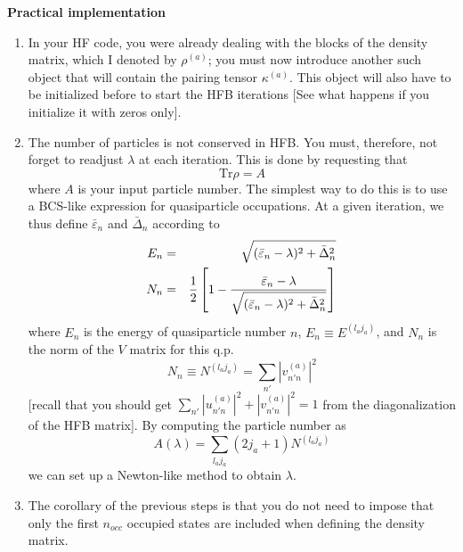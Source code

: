 {\bf Practical implementation}
\begin{enumerate}
\item In your HF code, you were already dealing with the blocks of the density 
matrix, which I denoted by $\rho^{(a)}$; you must now introduce another such 
object that will contain the pairing tensor $\kappa^{(a)}$. This object will 
also have to be initialized before to start the HFB iterations [See what 
happens if you initialize it with zeros only].
\item The number of particles is not conserved in HFB. You must, therefore, not 
forget to readjust $\lambda$ at each iteration. This is done by requesting that 
\begin{equation}
\text{Tr} \rho = A
\end{equation}
where $A$ is your input particle number. The simplest way to do this is to use  
a BCS-like expression for quasiparticle occupations. At a given iteration, we 
thus define $\bar{\varepsilon}_{n}$ and $\bar{\Delta}_{n}$ 
according to
\begin{eqnarray}
\displaystyle E_{n} &=& \displaystyle \sqrt{ (\bar{\varepsilon}_{n} - \lambda)^{2} + \bar{\Delta}_{n}^{2} } \medskip \\
\displaystyle N_{n} &=& \displaystyle \frac{1}{2} \left[ 1 - \frac{\bar{\varepsilon}_{n} - \lambda}{\sqrt{ (\bar{\varepsilon}_{n} - \lambda)^{2} + \bar{\Delta}_{n}^{2} }} \right]
\end{eqnarray}
where $E_{n}$ is the energy of quasiparticle number $n$, 
$E_{n} \equiv E^{(l_{a}j_{a})}$, and $N_{n}$ is the norm of the $V$ matrix for 
this q.p.
\begin{equation}
N_{n} \equiv N^{(l_{a}j_{a})}= \sum_{n'} |v^{(a)}_{n'n}|^{2}
\end{equation}
[recall that you should get 
$\sum_{n'} |u^{(a)}_{n'n}|^{2} + |v^{(a)}_{n'n}|^{2} = 1$ from the 
diagonalization of the HFB matrix]. By computing the particle number as
\begin{equation}
A(\lambda) = \sum_{l_{a}j_{a}} (2j_{a}+1) N^{(l_{a}j_{a})}
\end{equation}
we can set up a Newton-like method to obtain $\lambda$.
\item The corollary of the previous steps is that you do not need to impose 
that only the first $n_{occ}$ occupied states are included when defining the 
density matrix.
\end{enumerate}

